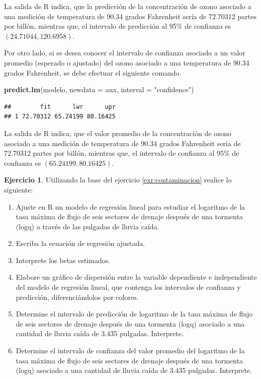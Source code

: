 \documentclass[
  11pt,
]{book}
\newenvironment{Shaded}{\begin{snugshade}}{\end{snugshade}}
\newcommand{\AttributeTok}[1]{\textcolor[rgb]{0.13,0.29,0.53}{#1}}
\newcommand{\FunctionTok}[1]{\textcolor[rgb]{0.13,0.29,0.53}{\textbf{#1}}}
\newcommand{\NormalTok}[1]{#1}
\newcommand{\StringTok}[1]{\textcolor[rgb]{0.31,0.60,0.02}{#1}}
\providecommand{\tightlist}{%
  \setlength{\itemsep}{0pt}\setlength{\parskip}{0pt}}
\theoremstyle{definition}
\theoremstyle{definition}
\theoremstyle{definition}
\newtheorem{exercise}{Ejercicio}[chapter]
\theoremstyle{definition}
\theoremstyle{remark}
\begin{document}
La salida de R indica, que la predicción de la concentración de ozono asociado a una medición de temperatura de 90.34 grados Fahrenheit sería de 72.70312 partes por billón, mientras que, el intervalo de predicción al 95\% de confianza es \((24.71044, 120.6958)\).

Por otro lado, si se desea conocer el intervalo de confianza asociado a un valor promedio (esperado o ajustado) del ozono asociado a una temperatura de 90.34 grados Fahrenheit, se debe efectuar el siguiente comando.

\begin{Shaded}
\begin{Highlighting}[]
\FunctionTok{predict.lm}\NormalTok{(modelo, }\AttributeTok{newdata =}\NormalTok{ aux, }\AttributeTok{interval =} \StringTok{"confidence"}\NormalTok{)}
\end{Highlighting}
\end{Shaded}

\begin{verbatim}
##        fit      lwr      upr
## 1 72.70312 65.24199 80.16425
\end{verbatim}

La salida de R indica, que el valor promedio de la concentración de ozono asociado a una medición de temperatura de 90.34 grados Fahrenheit sería de 72.70312 partes por billón, mientras que, el intervalo de confianza al 95\% de confianza es \((65.24199, 80.16425)\).

\begin{exercise}

Utilizando la base del ejercicio \ref{exr:contaminacion} realice lo siguiente:

\begin{enumerate}
\def\labelenumi{\arabic{enumi}.}
\tightlist
\item
  Ajuste en R un modelo de regresión lineal para estudiar el logaritmo de la tasa máxima de flujo de seis sectores de drenaje después de una tormenta (logq) a través de las pulgadas de lluvia caída.
\item
  Escriba la ecuación de regresión ajustada.
\item
  Interprete los betas estimados.
\item
  Elabore un gráfico de dispersión entre la variable dependiente e independiente del modelo de regresión lineal, que contenga los intervalos de confianza y predicción, diferenciándolos por colores.
\item
  Determine el intervalo de predicción de logaritmo de la tasa máxima de flujo de seis sectores de drenaje después de una tormenta (logq) asociado a una cantidad de lluvia caída de 3.435 pulgadas. Interprete.
\item
  Determine el intervalo de confianza del valor promedio del logaritmo de la tasa máxima de flujo de seis sectores de drenaje después de una tormenta (logq) asociado a una cantidad de lluvia caída de 3.435 pulgadas. Interprete.
\end{enumerate}

\end{exercise}
\end{document}
